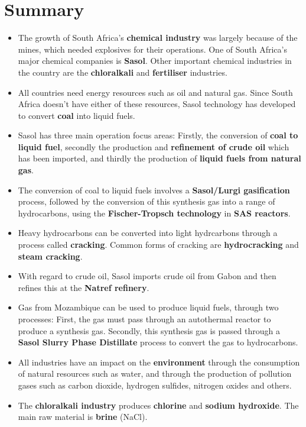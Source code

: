 \section{Summary}

\begin{itemize}
\item{The growth of South Africa's \textbf{chemical industry} was largely because of the mines, which needed explosives for their operations. One of South Africa's major chemical companies is \textbf{Sasol}. Other important chemical industries in the country are the \textbf{chloralkali} and \textbf{fertiliser} industries.}
\item{All countries need energy resources such as oil and natural gas. Since South Africa doesn't have either of these resources, Sasol technology has developed to convert \textbf{coal} into liquid fuels.}
\item{Sasol has three main operation focus areas: Firstly, the conversion of \textbf{coal to liquid fuel}, secondly the production and \textbf{refinement of crude oil} which has been imported, and thirdly the production of \textbf{liquid fuels from natural gas}.}
\item{The conversion of coal to liquid fuels involves a \textbf{Sasol/Lurgi gasification} process, followed by the conversion of this synthesis gas into a range of hydrocarbons, using the \textbf{Fischer-Tropsch technology} in \textbf{SAS reactors}.}
\item{Heavy hydrocarbons can be converted into light hydrcarbons through a process called \textbf{cracking}. Common forms of cracking are \textbf{hydrocracking} and \textbf{steam cracking}.}
\item{With regard to crude oil, Sasol imports crude oil from Gabon and then refines this at the \textbf{Natref refinery}.}
\item{Gas from Mozambique can be used to produce liquid fuels, through two processes: First, the gas must pass through an autothermal reactor to produce a synthesis gas. Secondly, this synthesis gas is passed through a \textbf{Sasol Slurry Phase Distillate} process to convert the gas to hydrocarbons.}
\item{All industries have an impact on the \textbf{environment} through the consumption of natural resources such as water, and through the production of pollution gases such as carbon dioxide, hydrogen sulfides, nitrogen oxides and others.}
\item{The \textbf{chloralkali industry} produces \textbf{chlorine} and \textbf{sodium hydroxide}. The main raw material is \textbf{brine} (NaCl).}

\end{itemize}
